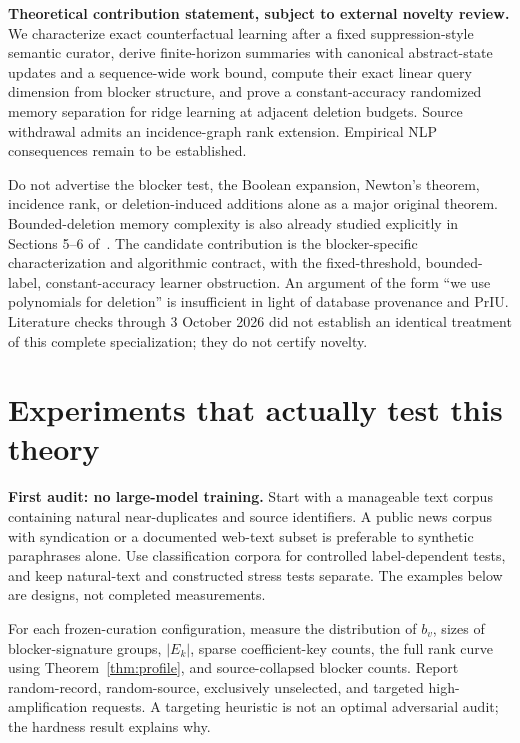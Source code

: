 \documentclass[11pt,a4paper]{article}
\theoremstyle{definition}\newtheorem{definition}[theorem]{Definition}
\begin{document}
\textbf{Theoretical contribution statement, subject to external novelty review.} We characterize exact counterfactual learning after a fixed suppression-style semantic curator, derive finite-horizon summaries with canonical abstract-state updates and a sequence-wide work bound, compute their exact linear query dimension from blocker structure, and prove a constant-accuracy randomized memory separation for ridge learning at adjacent deletion budgets. Source withdrawal admits an incidence-graph rank extension. Empirical NLP consequences remain to be established.

Do not advertise the blocker test, the Boolean expansion, Newton's theorem, incidence rank, or deletion-induced additions alone as a major original theorem. Bounded-deletion memory complexity is also already studied explicitly in Sections 5--6 of~\cite{cherapanamjeri2025}. The candidate contribution is the blocker-specific characterization and algorithmic contract, with the fixed-threshold, bounded-label, constant-accuracy learner obstruction. An argument of the form ``we use polynomials for deletion'' is insufficient in light of database provenance and PrIU. Literature checks through 3 October 2026 did not establish an identical treatment of this complete specialization; they do not certify novelty.

\section{Experiments that actually test this theory}
\textbf{First audit: no large-model training.} Start with a manageable text corpus containing natural near-duplicates and source identifiers. A public news corpus with syndication or a documented web-text subset is preferable to synthetic paraphrases alone. Use classification corpora for controlled label-dependent tests, and keep natural-text and constructed stress tests separate. The examples below are designs, not completed measurements.

For each frozen-curation configuration, measure the distribution of $b_v$, sizes of blocker-signature groups, $|E_k|$, sparse coefficient-key counts, the full rank curve using Theorem~\ref{thm:profile}, and source-collapsed blocker counts. Report random-record, random-source, exclusively unselected, and targeted high-amplification requests. A targeting heuristic is not an optimal adversarial audit; the hardness result explains why.
\end{document}
